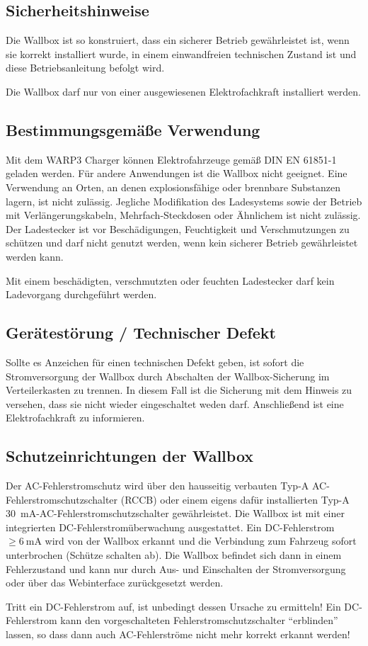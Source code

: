 \documentclass[a4paper,10pt]{article}
\newcommand{\hint}[1]{\begin{tcolorbox}[colback=boxgray,colframe=black,coltext=
white,title=Hinweis,left*=2mm,right*=2mm,boxsep=1mm,bottom=1mm,top=1mm]#1\end{tcolorbox}}
\begin{document}
\begin{multicols*}{2}

    \newpage
    \section{Sicherheitshinweise}
    Die Wallbox ist so konstruiert, dass ein sicherer Betrieb gewährleistet ist,
    wenn sie korrekt installiert wurde, in einem einwandfreien technischen Zustand
    ist und diese Betriebsanleitung befolgt wird. \hint{Die Wallbox darf nur von einer ausgewiesenen Elektrofachkraft installiert
        werden.}

    \subsection{Bestimmungsgemäße Verwendung}
    Mit dem WARP3 Charger können Elektrofahrzeuge gemäß DIN EN 61851-1 geladen
    werden. Für andere Anwendungen ist die Wallbox nicht geeignet. Eine Verwendung
    an Orten, an denen explosionsfähige oder brennbare Substanzen lagern, ist nicht
    zulässig. Jegliche Modifikation des Ladesystems sowie der Betrieb mit
    Verlängerungskabeln, Mehrfach-Steckdosen oder Ähnlichem ist nicht zulässig. Der
    Ladestecker ist vor Beschädigungen, Feuchtigkeit und Verschmutzungen zu
    schützen und darf nicht genutzt werden, wenn kein sicherer Betrieb
    gewährleistet werden kann. \hint{Mit einem beschädigten, verschmutzten oder feuchten Ladestecker darf kein Ladevorgang durchgeführt
        werden.}

    \subsection{Gerätestörung / Technischer Defekt}
    Sollte es Anzeichen für einen technischen Defekt geben, ist sofort die
    Stromversorgung der Wallbox durch Abschalten der Wallbox-Sicherung im Verteilerkasten zu trennen.
    In diesem Fall ist die Sicherung mit dem Hinweis zu versehen, dass sie nicht wieder eingeschaltet weden darf.
    Anschließend ist eine Elektrofachkraft zu informieren.

    \subsection{Schutzeinrichtungen der Wallbox}\label{dcerrorhint}
    Der AC-Fehlerstromschutz wird über den hausseitig verbauten
    Typ-A AC-Fehlerstromschutzschalter (RCCB) oder einem eigens dafür installierten
    Typ-A \SI{30}{\milli\ampere}-AC-Fehlerstromschutzschalter gewährleistet. Die Wallbox ist
    mit einer integrierten DC-Fehlerstromüberwachung ausgestattet.
    Ein DC-Fehlerstrom $\geq \SI{6}{\milli\ampere}$ wird von der Wallbox erkannt und die Verbindung zum Fahrzeug sofort
    unterbrochen (Schütze schalten ab). Die Wallbox befindet sich dann in einem
    Fehlerzustand und kann nur durch Aus- und Einschalten der
    Stromversorgung oder über das Webinterface zurückgesetzt werden.
    \hint{Tritt ein DC-Fehlerstrom auf, ist unbedingt dessen Ursache zu
    ermitteln! Ein DC-Fehlerstrom kann den vorgeschalteten Fehlerstromschutzschalter
    \enquote{erblinden} lassen, so dass dann auch AC-Fehlerströme
    nicht mehr korrekt erkannt werden!}


\end{multicols*}
\end{document}

